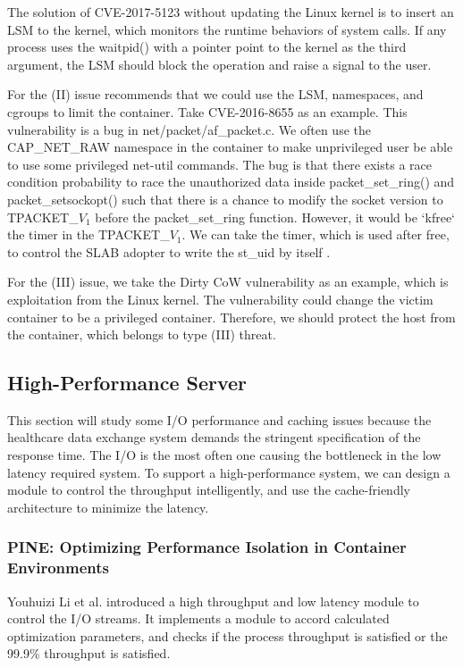 \documentclass[12pt,a4paper]{article}
\begin{document}
The solution of CVE-2017-5123 without updating the Linux kernel is to insert an
LSM to the kernel, which monitors the runtime behaviors of system calls. If any process
uses the waitpid() with a pointer point to the kernel as the third argument, the LSM should
block the operation and raise a signal to the user.

For the (\RN{2}) issue \cite{Road_Ahead} recommends that we could use the
LSM, namespaces, and cgroups to limit the container. Take CVE-2016-8655 \cite{CVE-2016-8655,Measurement}
as an example. This vulnerability is a bug in net/packet/af\_packet.c. We often use the
CAP\_NET\_RAW namespace in the container to make unprivileged user be able to use some privileged
net-util commands. The bug is that there exists a race condition probability to race the unauthorized
data inside packet\_set\_ring() and packet\_setsockopt() \cite{CVE-2016-8655-lwn} such that
there is a chance to modify the socket version to TPACKET\_$V_1$ before the packet\_set\_ring
function. However, it would be `kfree` the timer in the TPACKET\_$V_1$. We can take the timer,
which is used after free, to control the SLAB adopter to write the st\_uid by itself
\cite{AF_PACKET}.

For the (\RN{3}) issue, we take the Dirty CoW vulnerability as an example, which is exploitation
from the Linux kernel. The vulnerability could change the victim container to be a privileged
container. Therefore, we should protect the host from the container, which belongs to type
(\RN{3}) threat.

\subsection{High-Performance Server}
\hypertarget{heigh_performance}{}
This section will study some I/O performance and caching issues because the healthcare
data exchange system demands the stringent specification of the response time.
The I/O is the most often one causing the bottleneck in the low latency required system.
To support a high-performance system, we can design a module to control the throughput
intelligently, and use the cache-friendly architecture to minimize the latency.

\subsubsection{PINE: Optimizing Performance Isolation in Container Environments}
Youhuizi Li et al. \cite{Optimizing} introduced a high throughput and low latency module to control
the I/O streams. It implements a module to accord calculated optimization parameters,
and checks if the process throughput is satisfied or the 99.9\% throughput is satisfied.
\end{document}
